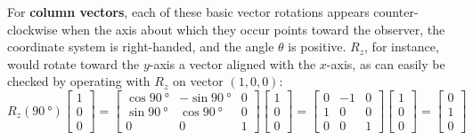 For \textbf{column vectors}, each of these basic vector rotations appears counter-clockwise when the axis about which they occur points toward the observer, the coordinate system is right-handed, and the angle $ \theta $ is positive. $ R_z $, for instance, would rotate toward the $ y $-axis a vector aligned with the $ x $-axis, as can easily be checked by operating with $ R_z $ on vector $ (1, 0, 0) $:
\begin{equation}
R_z(\SI{90}{\degree})\begin{bmatrix}
1\\
0\\
0
\end{bmatrix} = \begin{bmatrix}
\cos \SI{90}{\degree} & -\sin \SI{90}{\degree} & 0\\
\sin \SI{90}{\degree} & \cos \SI{90}{\degree} & 0\\
0 & 0 & 1
\end{bmatrix} \begin{bmatrix}
1\\
0\\
0
\end{bmatrix} = \begin{bmatrix}
0 & -1 & 0\\
1 & 0 & 0\\
0 & 0 & 1
\end{bmatrix} \begin{bmatrix}
1\\
0\\
0
\end{bmatrix} = \begin{bmatrix}
0\\
1\\
0
\end{bmatrix} 
\end{equation}